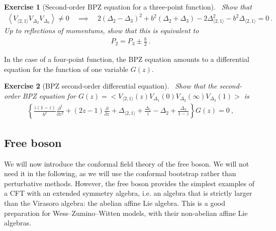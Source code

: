 \documentclass[12pt, a4paper]{article}
\theoremstyle{break}
\newtheorem{exo}{Exercise}[section]
\begin{document}
\begin{exo}[Second-order BPZ equation for a three-point function]
 ~\label{exo:bpz3pt}
 Show that 
\begin{align}
 \left< V_{\langle 2, 1 \rangle} V_{\Delta_2} V_{\Delta_3} \right> \neq 0 \quad \implies \quad 
 2(\Delta_2-\Delta_3)^2 +b^2(\Delta_2+\Delta_3) -2\Delta_{\langle 2, 1 \rangle}^2 -b^2\Delta_{\langle 2, 1 \rangle} = 0\ .
 \end{align}
 Up to reflections of momentums, show that this is equivalent to
 \begin{align}
 P_2 = P_3 \pm \frac{b}{2}\ .
 \label{eq:alpm}
\end{align}
\end{exo}

In the case of a four-point function, the BPZ equation amounts to a differential equation for the function of one variable $G(z)$.

\begin{exo}[BPZ second-order differential equation]
 ~\label{exo:bpz}
 Show that the second-order BPZ equation for $G(z)=\Big< V_{\langle 2, 1 \rangle}(z) V_{\Delta_1}(0)V_{\Delta_2}(\infty)V_{\Delta_3}(1) \Big>$ is
 \begin{align}
  \left\{ \frac{z(1-z)}{b^2}\frac{\partial^2}{\partial z^2} + (2z-1){\frac{\partial}{\partial z}} +\Delta_{\langle 2,1 \rangle} +\frac{\Delta_1}{z}-\Delta_2 + \frac{\Delta_3}{1-z}\right\} G(z)=0\ ,
\label{eq:ode}
 \end{align}
\end{exo}

\subsection{Free boson}

We will now introduce the conformal field theory of the free boson. We will not need it in the following, as we will use the conformal bootstrap rather than perturbative methods. However, the free boson provides the simplest examples of a CFT with an extended symmetry algebra, i.e. an algebra that is strictly larger than the Virasoro algebra: the abelian affine Lie algebra. This is a good preparation for Wess--Zumino--Witten models, with their non-abelian affine Lie algebras.
\end{document}
